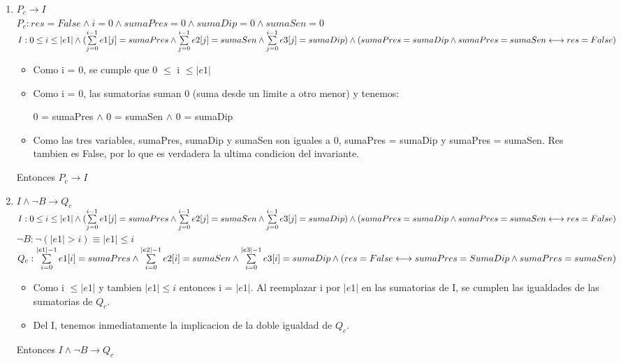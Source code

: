 \documentclass[10pt,a4paper]{article}
\begin{document}
\begin{enumerate}
\begin{enumerate}
    \item $P_c \longrightarrow I$ \\
    $P_c : res=False \land i=0 \land sumaPres=0 \land sumaDip=0 \land sumaSen=0$ \\
    $I : 0 \leq i \leq |e1| \land (\sum\limits_{j=0}^{i - 1} e1[j] = sumaPres \land \sum\limits_{j=0}^{i - 1} e2[j] = sumaSen \land \sum\limits_{j=0}^{i - 1} e3[j] = sumaDip) \land \\
    (sumaPres = sumaDip  \land sumaPres = sumaSen \longleftrightarrow res = False) 
    $
    \begin{itemize}
        \item Como i = 0, se cumple que 0 $\leq$ i $\leq |e1|$
        \item Como i = 0, las sumatorias suman 0 (suma desde un limite a otro menor) y tenemos:
        \begin{center}
            0 = sumaPres $\land$ 0 = sumaSen $\land$ 0 = sumaDip 
        \end{center}
        \item Como las tres variables, sumaPres, sumaDip y sumaSen son iguales a 0, sumaPres = sumaDip y sumaPres = sumaSen. Res tambien es False, por lo que es verdadera la ultima condicion del invariante.
    \end{itemize}
    Entonces $P_c \longrightarrow I$
    
    
    \item $I \land \neg{B} \longrightarrow Q_c$ \\
    
    $I : 0 \leq i \leq |e1| \land (\sum\limits_{j=0}^{i - 1} e1[j] = sumaPres \land \sum\limits_{j=0}^{i - 1} e2[j] = sumaSen \land
    \sum\limits_{j=0}^{i - 1} e3[j] = sumaDip) \land \\
    (sumaPres = sumaDip  \land sumaPres = sumaSen \longleftrightarrow res = False)$ \\
    
    $\neg{B} : \neg{(|e1| > i)} \equiv |e1| \leq i $ \\
    $Q_c :  \sum\limits_{i=0}^{|e1| - 1} e1[i] = sumaPres \land \sum\limits_{i=0}^{|e2| - 1} e2[i] = sumaSen \land \sum\limits_{i=0}^{|e3| - 1} e3[i] = sumaDip \land \\ 
 (res = False \longleftrightarrow sumaPres = SumaDip \land sumaPres = sumaSen)$
 \begin{itemize}
     \item Como i $\leq |e1|$ y tambien $|e1| \leq i$ entonces i = $|e1|$. Al reemplazar i por $|e1|$ en las sumatorias de I, se cumplen las igualdades de las sumatorias de $Q_c$.
     \item Del I, tenemos inmediatamente la implicacion de la doble igualdad de $Q_c$.
 \end{itemize}
 Entonces $I \land \neg{B} \longrightarrow Q_c$
    

\end{enumerate}
\end{enumerate}
\end{document}
